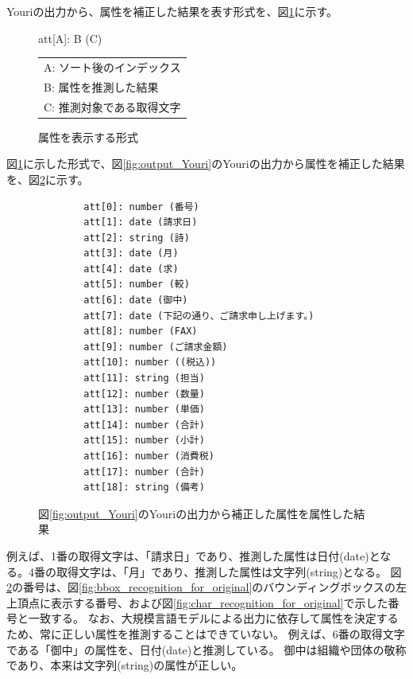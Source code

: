 Youriの出力から、属性を補正した結果を表す形式を、図\ref{fig:format_att}に示す。
\begin{figure}[tp]
    \begin{center}
        att[A]: B (C)
    \end{center}

    \begin{center}
        \begin{tabular}{l}
            A: ソート後のインデックス\\
            B: 属性を推測した結果\\
            C: 推測対象である取得文字\\
        \end{tabular}
    \end{center}
    \caption{属性を表示する形式}
    \label{fig:format_att}
\end{figure}
図\ref{fig:format_att}に示した形式で、図\ref{fig:output_Youri}のYouriの出力から属性を補正した結果を、図\ref{fig:predict_att_for_original}に示す。
\lstset{language=}
\begin{figure}[tp]
    \begin{lstlisting}
        att[0]: number (番号)
        att[1]: date (請求日)
        att[2]: string (詩)
        att[3]: date (月)
        att[4]: date (求)
        att[5]: number (較)
        att[6]: date (御中)
        att[7]: date (下記の通り、ご請求申し上げます。)
        att[8]: number (FAX)
        att[9]: number (ご請求金額)
        att[10]: number ((税込))
        att[11]: string (担当)
        att[12]: number (数量)
        att[13]: number (単価)
        att[14]: number (合計)
        att[15]: number (小計)
        att[16]: number (消費税)
        att[17]: number (合計)
        att[18]: string (備考)
    \end{lstlisting}
    \caption{図\ref{fig:output_Youri}のYouriの出力から補正した属性を属性した結果}
    \label{fig:predict_att_for_original}
\end{figure}
例えば、1番の取得文字は、「請求日」であり、推測した属性は日付(date)となる。4番の取得文字は、「月」であり、推測した属性は文字列(string)となる。
図\ref{fig:predict_att_for_original}の番号は、図\ref{fig:bbox_recognition_for_original}のバウンディングボックスの左上頂点に表示する番号、および図\ref{fig:char_recognition_for_original}で示した番号と一致する。
なお、大規模言語モデルによる出力に依存して属性を決定するため、常に正しい属性を推測することはできていない。
例えば、6番の取得文字である「御中」の属性を、日付(date)と推測している。
御中は組織や団体の敬称であり、本来は文字列(string)の属性が正しい。

